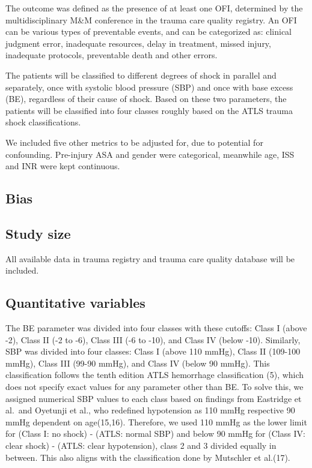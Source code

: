 \documentclass[
]{article}
\begin{document}
The outcome was defined as the presence of at least one OFI, determined
by the multidisciplinary M\&M conference in the trauma care quality
registry. An OFI can be various types of preventable events, and can be
categorized as: clinical judgment error, inadequate resources, delay in
treatment, missed injury, inadequate protocols, preventable death and
other errors.

The patients will be classified to different degrees of shock in
parallel and separately, once with systolic blood pressure (SBP) and
once with base excess (BE), regardless of their cause of shock. Based on
these two parameters, the patients will be classified into four classes
roughly based on the ATLS trauma shock classifications.

We included five other metrics to be adjusted for, due to potential for
confounding. Pre-injury ASA and gender were categorical, meanwhile age,
ISS and INR were kept continuous.

\hypertarget{bias}{%
\subsection{Bias}\label{bias}}

\hypertarget{study-size}{%
\subsection{Study size}\label{study-size}}

All available data in trauma registry and trauma care quality database
will be included.

\hypertarget{quantitative-variables}{%
\subsection{Quantitative variables}\label{quantitative-variables}}

The BE parameter was divided into four classes with these cutoffs: Class
I (above -2), Class II (-2 to -6), Class III (-6 to -10), and Class IV
(below -10). Similarly, SBP was divided into four classes: Class I
(above 110 mmHg), Class II (109-100 mmHg), Class III (99-90 mmHg), and
Class IV (below 90 mmHg). This classification follows the tenth edition
ATLS hemorrhage classification (5), which does not specify exact values
for any parameter other than BE. To solve this, we assigned numerical
SBP values to each class based on findings from Eastridge et al.~and
Oyetunji et al., who redefined hypotension as 110 mmHg respective 90
mmHg dependent on age(15,16). Therefore, we used 110 mmHg as the lower
limit for (Class I: no shock) - (ATLS: normal SBP) and below 90 mmHg for
(Class IV: clear shock) - (ATLS: clear hypotension), class 2 and 3
divided equally in between. This also aligns with the classification
done by Mutschler et al.(17).
\end{document}
